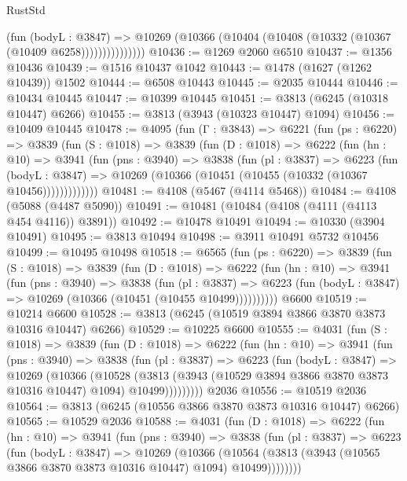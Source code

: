 \begin{lexlean}{RustStd}
\begin{coremodule}
                    (fun (bodyL : @3847) =>
                    @10269 (@10366 (@10404 (@10408 (@10332 (@10367 (@10409 @6258)))))))))))))))
@10436 := @1269 @2060 @6510
@10437 := @1356 @10436
@10439 := @1516 @10437 @1042
@10443 := @1478 (@1627 (@1262 @10439)) @1502
@10444 := @6508 @10443
@10445 := @2035 @10444
@10446 := @10434 @10445
@10447 := @10399 @10445
@10451 := @3813 (@6245 (@10318 @10447) @6266)
@10455 := @3813 (@3943 (@10323 @10447) @1094)
@10456 := @10409 @10445
@10478 := @4095
    (fun (Γ : @3843) =>
    @6221
      (fun (ps : @6220) =>
      @3839
        (fun (S : @1018) =>
        @3839
          (fun (D : @1018) =>
          @6222
            (fun (hn : @10) =>
            @3941
              (fun (pns : @3940) =>
              @3838
                (fun (pl : @3837) =>
                @6223
                  (fun (bodyL : @3847) =>
                  @10269 (@10366 (@10451 (@10455 (@10332 (@10367 @10456)))))))))))))
@10481 := @4108 (@5467 (@4114 @5468))
@10484 := @4108 (@5088 (@4487 @5090))
@10491 := @10481 (@10484 (@4108 (@4111 (@4113 @454 @4116)) @3891))
@10492 := @10478 @10491
@10494 := @10330 (@3904 @10491)
@10495 := @3813 @10494
@10498 := @3911 @10491 @5732 @10456
@10499 := @10495 @10498
@10518 := @6565
    (fun (ps : @6220) =>
    @3839
      (fun (S : @1018) =>
      @3839
        (fun (D : @1018) =>
        @6222
          (fun (hn : @10) =>
          @3941
            (fun (pns : @3940) =>
            @3838
              (fun (pl : @3837) =>
              @6223 (fun (bodyL : @3847) => @10269 (@10366 (@10451 (@10455 @10499))))))))))
    @6600
@10519 := @10214 @6600
@10528 := @3813 (@6245 (@10519 @3894 @3866 @3870 @3873 @10316 @10447) @6266)
@10529 := @10225 @6600
@10555 := @4031
    (fun (S : @1018) =>
    @3839
      (fun (D : @1018) =>
      @6222
        (fun (hn : @10) =>
        @3941
          (fun (pns : @3940) =>
          @3838
            (fun (pl : @3837) =>
            @6223
              (fun (bodyL : @3847) =>
              @10269
                (@10366
                  (@10528
                    (@3813
                      (@3943 (@10529 @3894 @3866 @3870 @3873 @10316 @10447) @1094)
                      @10499)))))))))
    @2036
@10556 := @10519 @2036
@10564 := @3813 (@6245 (@10556 @3866 @3870 @3873 @10316 @10447) @6266)
@10565 := @10529 @2036
@10588 := @4031
    (fun (D : @1018) =>
    @6222
      (fun (hn : @10) =>
      @3941
        (fun (pns : @3940) =>
        @3838
          (fun (pl : @3837) =>
          @6223
            (fun (bodyL : @3847) =>
            @10269
              (@10366
                (@10564 (@3813 (@3943 (@10565 @3866 @3870 @3873 @10316 @10447) @1094) @10499))))))))

\end{coremodule}
\end{lexlean}

